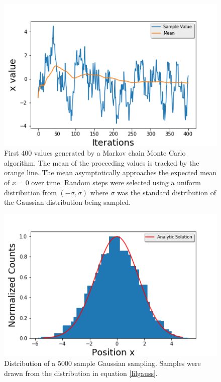 \message{ !name(Assn1.tex)}\documentclass[twocolumn]{article}
\begin{document}
 \begin{figure}
\centering
\includegraphics[width=\linewidth]{MCMCmean}
\caption{First 400 values generated by a Markov chain Monte Carlo algorithm. The mean of the proceeding values is tracked by the orange line. The mean asymptotically approaches the expected mean of $x=0$ over time. Random steps were selected using a uniform distribution from $(-\sigma, \sigma)$ where $\sigma$ was the standard distribution of the Gaussian distribution being sampled.}
\label{fig:MCMCmean}
\end{figure}

\begin{figure}
\centering
\includegraphics[width=\linewidth]{MCMChisto}
\caption{Distribution of a 5000 sample Gaussian sampling. Samples were drawn from the distribution in equation \ref{lilgauss}.}
\label{fig:MCMChisto}
\end{figure}
\end{document}
